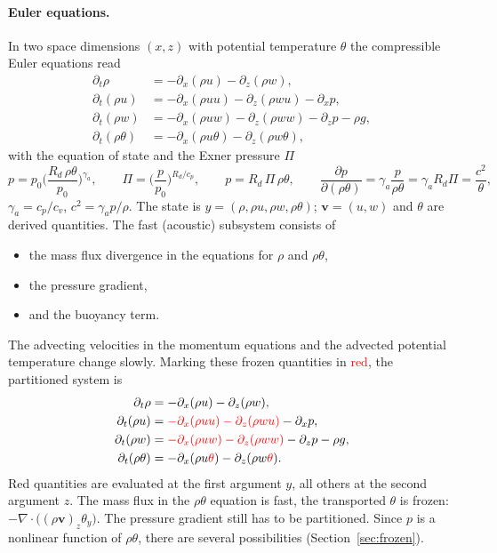 \documentclass[11pt,a4paper]{article}
\theoremstyle{definition}
\theoremstyle{remark}
\begin{document}
\paragraph{Euler equations.}
In two space dimensions $(x,z)$ with potential temperature $\theta$ the
compressible Euler equations read
\begin{equation}\label{eq:euler}
\begin{aligned}
 \partial_t\rho&=-\partial_x(\rho u)-\partial_z(\rho w),\\
 \partial_t(\rho u)&=-\partial_x(\rho uu)-\partial_z(\rho wu)-\partial_x p,\\
 \partial_t(\rho w)&=-\partial_x(\rho uw)-\partial_z(\rho ww)-\partial_z p-\rho g,\\
 \partial_t(\rho\theta)&=-\partial_x(\rho u\theta)-\partial_z(\rho w\theta),
\end{aligned}
\end{equation}
with the equation of state and the Exner pressure $\Pi$
\begin{equation*}
 p=p_0\Big(\frac{R_d\,\rho\theta}{p_0}\Big)^{\gamma_a},\qquad
 \Pi=\Big(\frac p{p_0}\Big)^{R_d/c_p},\qquad
 p=R_d\,\Pi\,\rho\theta,\qquad
 \frac{\partial p}{\partial(\rho\theta)}=\gamma_a\frac{p}{\rho\theta}
 =\gamma_aR_d\Pi=\frac{c^2}{\theta},
\end{equation*}
$\gamma_a=c_p/c_v$, $c^2=\gamma_ap/\rho$. The state is
$y=(\rho,\rho u,\rho w,\rho\theta)$; $\mathbf v=(u,w)$ and $\theta$ are
derived quantities. The fast (acoustic) subsystem consists of
\begin{itemize}
\item the mass flux divergence in the equations for $\rho$ and
  $\rho\theta$,
\item the pressure gradient,
\item and the buoyancy term.
\end{itemize}
The advecting velocities in the momentum equations and the advected
potential temperature change slowly. Marking these frozen quantities in
\textcolor{red}{red}, the partitioned system is
\begin{equation}\label{eq:eulerred}
\begin{aligned}
 \partial_t\rho&=-\partial_x(\rho u)-\partial_z(\rho w),\\
 \partial_t(\rho u)&=\textcolor{red}{-\partial_x(\rho uu)-\partial_z(\rho wu)}-\partial_x p,\\
 \partial_t(\rho w)&=\textcolor{red}{-\partial_x(\rho uw)-\partial_z(\rho ww)}-\partial_z p-\rho g,\\
 \partial_t(\rho\theta)&=-\partial_x(\rho u\textcolor{red}{\theta})-\partial_z(\rho w\textcolor{red}{\theta}).
\end{aligned}
\end{equation}
Red quantities are evaluated at the first argument $y$, all others at
the second argument $z$. The mass flux in the $\rho\theta$ equation is
fast, the transported $\theta$ is frozen:
$-\nabla\cdot\big((\rho\mathbf v)_z\theta_y\big)$. The pressure
gradient still has to be partitioned. Since $p$ is a nonlinear function
of $\rho\theta$, there are several possibilities (Section~\ref{sec:frozen}).
\end{document}

